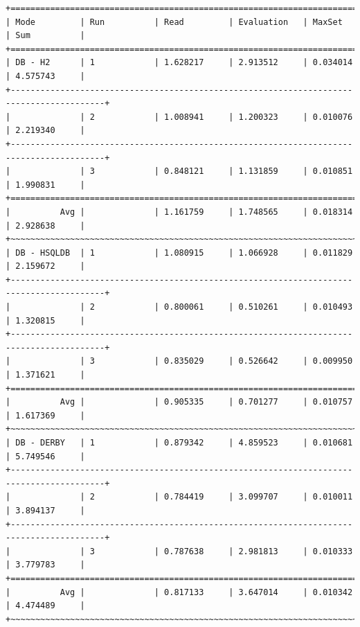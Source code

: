 \documentclass[draft,final]{vutinfth} %
\begin{document}
\begin{lstlisting}[basicstyle=\tiny,caption={Benchmark DB \textbf{mit} Indizes, Datei: lubm-ex-20-17.sparql.xml},label={lst:dbmi17}]
+=========================================================================================+
| Mode         | Run          | Read         | Evaluation   | MaxSet       | Sum          | 
+=========================================================================================+
| DB - H2      | 1            | 1.628217     | 2.913512     | 0.034014     | 4.575743     | 
+-----------------------------------------------------------------------------------------+
|              | 2            | 1.008941     | 1.200323     | 0.010076     | 2.219340     | 
+-----------------------------------------------------------------------------------------+
|              | 3            | 0.848121     | 1.131859     | 0.010851     | 1.990831     | 
+=========================================================================================+
|          Avg |              | 1.161759     | 1.748565     | 0.018314     | 2.928638     | 
+~~~~~~~~~~~~~~~~~~~~~~~~~~~~~~~~~~~~~~~~~~~~~~~~~~~~~~~~~~~~~~~~~~~~~~~~~~~~~~~~~~~~~~~~~+
| DB - HSQLDB  | 1            | 1.080915     | 1.066928     | 0.011829     | 2.159672     | 
+-----------------------------------------------------------------------------------------+
|              | 2            | 0.800061     | 0.510261     | 0.010493     | 1.320815     | 
+-----------------------------------------------------------------------------------------+
|              | 3            | 0.835029     | 0.526642     | 0.009950     | 1.371621     | 
+=========================================================================================+
|          Avg |              | 0.905335     | 0.701277     | 0.010757     | 1.617369     | 
+~~~~~~~~~~~~~~~~~~~~~~~~~~~~~~~~~~~~~~~~~~~~~~~~~~~~~~~~~~~~~~~~~~~~~~~~~~~~~~~~~~~~~~~~~+
| DB - DERBY   | 1            | 0.879342     | 4.859523     | 0.010681     | 5.749546     | 
+-----------------------------------------------------------------------------------------+
|              | 2            | 0.784419     | 3.099707     | 0.010011     | 3.894137     | 
+-----------------------------------------------------------------------------------------+
|              | 3            | 0.787638     | 2.981813     | 0.010333     | 3.779783     | 
+=========================================================================================+
|          Avg |              | 0.817133     | 3.647014     | 0.010342     | 4.474489     | 
+~~~~~~~~~~~~~~~~~~~~~~~~~~~~~~~~~~~~~~~~~~~~~~~~~~~~~~~~~~~~~~~~~~~~~~~~~~~~~~~~~~~~~~~~~+
\end{lstlisting}
\end{document}
